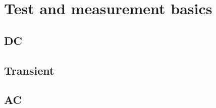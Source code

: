 \documentclass[a4paper]{article}
\begin{document}
\newpage
\section{Test and measurement basics}
\subsection{DC}
\subsection{Transient}
\subsection{AC}
\end{document}
